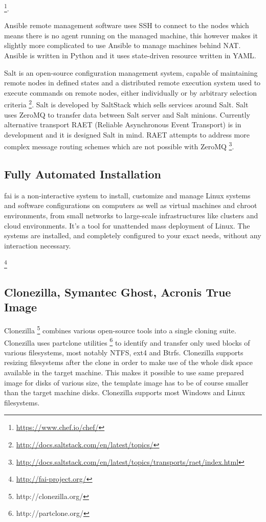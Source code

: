 \documentclass[a4paper,11pt]{kth-mag}
\begin{document}
\cite{linuxmag-7841}


\footnote{\url{https://www.chef.io/chef/}}.

Ansible remote management software uses SSH to connect to the nodes which
means there is no agent running on the managed machine, this however makes
it slightly more complicated to use Ansible to manage machines behind NAT.
Ansible is written in Python and it uses state-driven resource 
written in YAML.

Salt is an open-source configuration management system,
capable of maintaining remote nodes in defined states and 
a distributed remote execution system used to execute commands
on remote nodes, either individually or by arbitrary selection criteria
\footnote{\url{http://docs.saltstack.com/en/latest/topics/}}.
Salt is developed by SaltStack which sells services around Salt.
Salt uses ZeroMQ to transfer data between Salt server and
Salt minions.
Currently alternative transport
RAET (Reliable Asynchronous Event Transport)
is in development and it is designed Salt in mind.
RAET attempts to address more complex message routing
schemes which are not possible with ZeroMQ
\footnote{\url{http://docs.saltstack.com/en/latest/topics/transports/raet/index.html}}.


\subsection{Fully Automated Installation}


\gls{fai} is a non-interactive system to install, customize and manage
Linux systems and software configurations on computers as well as
virtual machines and chroot environments, from small networks to
large-scale infrastructures like clusters and cloud environments.
It's a tool for unattended mass deployment of Linux. The systems
are installed, and completely configured to your exact needs,
without any interaction necessary. 




\footnote{\url{http://fai-project.org/}}

\subsection{Clonezilla, Symantec Ghost, Acronis True Image}

Clonezilla \footnote{http://clonezilla.org/}
combines various open-source tools into a single cloning suite.
Clonezilla uses partclone utilities \footnote{http://partclone.org/} to
identify and transfer only used blocks of various filesystems, most notably
NTFS, ext4 and Btrfs.
Clonezilla supports resizing filesystems after the clone
in order to make use of the whole disk space available
in the target machine.
This makes it possible to use same prepared image for disks of
various size, the template image has to be of course smaller
than the target machine disks.
Clonezilla supports most Windows and Linux filesystems.
\end{document}
